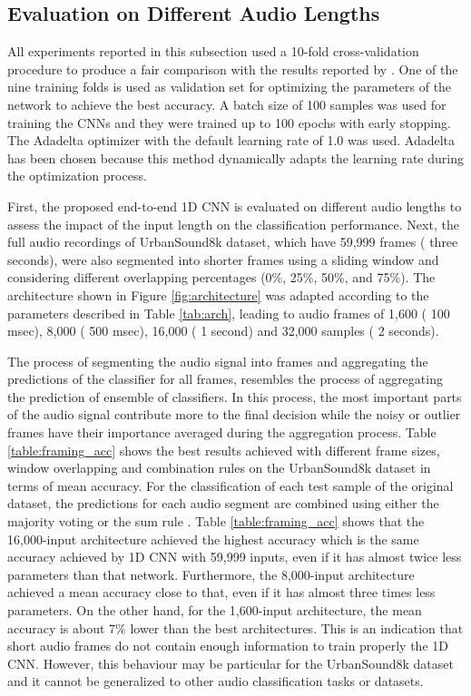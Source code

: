 \documentclass[preprint,final,12pt]{elsarticle}
\begin{document}
\subsection{Evaluation on Different Audio Lengths}
\label{sec:diffleng}
All experiments reported in this subsection used a 10-fold cross-validation procedure to produce a fair comparison with the results reported by \citet{Salamon:2014:DTU:2647868.2655045}. One of the nine training folds is used as validation set for optimizing the parameters of the network to achieve the best accuracy. A batch size of 100 samples was used for training the CNNs and they were trained up to 100 epochs with early stopping. The Adadelta \citep{zeiler2012adadelta} optimizer with the default learning rate of 1.0 was used. Adadelta has been chosen because this method dynamically adapts the learning rate during the optimization process.

First, the proposed end-to-end 1D CNN is evaluated on different audio lengths to assess the impact of the input length on the classification performance. Next, the full audio recordings of UrbanSound8k dataset, which have 59,999 frames ( three seconds), were also segmented into shorter frames using a sliding window and considering different overlapping percentages (0\%, 25\%, 50\%, and 75\%). The architecture shown in Figure \ref{fig:architecture} was adapted according to the parameters described in Table \ref{tab:arch}, leading to audio frames of 1,600 ( 100 msec), 8,000 ( 500 msec), 16,000 ( 1 second) and 32,000 samples ( 2 seconds).

The process of segmenting the audio signal into frames and aggregating the predictions of the classifier for all frames, resembles the process of aggregating the prediction of ensemble of classifiers. In this process, the most important parts of the audio signal contribute more to the final decision while the noisy or outlier frames have their importance averaged during the aggregation process. Table \ref{table:framing_acc} shows the best results achieved with different frame sizes, window overlapping and combination rules on the UrbanSound8k dataset in terms of mean accuracy. For the classification of each test sample of the original dataset, the predictions for each audio segment are combined using either the majority voting or the sum rule \citep{kittler1998combining}. Table \ref{table:framing_acc} shows that the 16,000-input architecture achieved the highest accuracy which is the same accuracy achieved by 1D CNN with 59,999 inputs, even if it has almost twice less parameters than that network. Furthermore, the 8,000-input architecture achieved a mean accuracy close to that, even if it has almost three times less parameters. On the other hand, for the 1,600-input architecture, the mean accuracy is about 7\% lower than the best architectures. This is an indication that short audio frames do not contain enough information to train properly the 1D CNN. However, this behaviour may be particular for the UrbanSound8k dataset and it cannot be generalized to other audio classification tasks or datasets.
\end{document}
